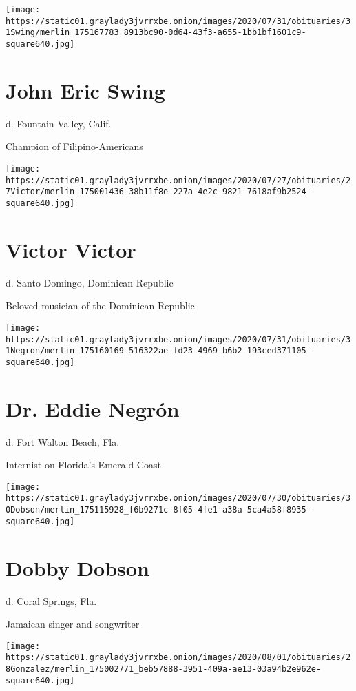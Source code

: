 \texttt{[image: https://static01.graylady3jvrrxbe.onion/images/2020/07/31/obituaries/31Swing/merlin\_175167783\_8913bc90-0d64-43f3-a655-1bb1bf1601c9-square640.jpg]}

\hypertarget{john-eric-swing}{%
\section{John Eric Swing}\label{john-eric-swing}}

d. Fountain Valley, Calif.

Champion of Filipino-Americans

\texttt{[image: https://static01.graylady3jvrrxbe.onion/images/2020/07/27/obituaries/27Victor/merlin\_175001436\_38b11f8e-227a-4e2c-9821-7618af9b2524-square640.jpg]}

\hypertarget{victor-victor}{%
\section{Victor Victor}\label{victor-victor}}

d. Santo Domingo, Dominican Republic

Beloved musician of the Dominican Republic

\texttt{[image: https://static01.graylady3jvrrxbe.onion/images/2020/07/31/obituaries/31Negron/merlin\_175160169\_516322ae-fd23-4969-b6b2-193ced371105-square640.jpg]}

\hypertarget{dr-eddie-negruxf3n}{%
\section{Dr. Eddie Negrón}\label{dr-eddie-negruxf3n}}

d. Fort Walton Beach, Fla.

Internist on Florida's Emerald Coast

\texttt{[image: https://static01.graylady3jvrrxbe.onion/images/2020/07/30/obituaries/30Dobson/merlin\_175115928\_f6b9271c-8f05-4fe1-a38a-5ca4a58f8935-square640.jpg]}

\hypertarget{dobby-dobson}{%
\section{Dobby Dobson}\label{dobby-dobson}}

d. Coral Springs, Fla.

Jamaican singer and songwriter

\texttt{[image: https://static01.graylady3jvrrxbe.onion/images/2020/08/01/obituaries/28Gonzalez/merlin\_175002771\_beb57888-3951-409a-ae13-03a94b2e962e-square640.jpg]}

